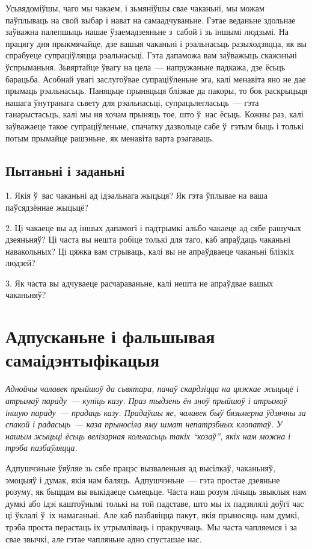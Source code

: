 Усьвядоміўшы, чаго мы чакаем, і зьмяніўшы свае чаканьні, мы можам паўплываць на свой выбар і нават на самаадчуваньне. Гэтае веданьне здольнае заўважна палепшыць нашае ўзаемадзеяньне з~сабой і зь іншымі людзьмі. На працягу дня прыкмячайце, дзе вашыя чаканьні і рэальнасьць разыходзяцца, як вы спрабуеце супраціўляцца рэальнасьці. Гэта дапаможа вам заўважыць скажэньні ўспрыманьня. Зьвяртайце ўвагу на цела~--- напружаньне падкажа, дзе ёсьць барацьба. Асобнай увагі заслугоўвае супраціўленьне эга, калі менавіта яно не дае прымаць рэальнасьць. Паняцьце прыняцьця блізкае да пакоры, то бок раскрыцьця нашага ўнутранага сьвету для рэальнасьці, супрацьлегласьць~--- гэта ганарыстасьць, калі мы ня хочам прыняць тое, што ў~нас ёсьць. Кожны раз, калі заўважаеце такое супраціўленьне, спачатку дазвольце сабе ў~гэтым быць і толькі потым прымайце рашэньне, як менавіта варта рэагаваць.

\subsection*{Пытаньні і заданьні}

1. Якія ў~вас чаканьні ад ідэальнага жыцьця? Як гэта ўплывае на ваша паўсядзённае жыцьцё?

2. Ці чакаеце вы ад іншых дапамогі і падтрымкі альбо чакаеце ад сябе рашучых дзеяньняў? Ці часта вы нешта робіце толькі для таго, каб апраўдаць чаканьні навакольных? Ці цяжка вам стрываць, калі вы не апраўдваеце чаканьні блізкіх людзей?

3. Як часта вы адчуваеце расчараваньне, калі нешта не апраўдвае вашых чаканьняў?


\section{Адпусканьне і фальшывая самаідэнтыфікацыя}

\emph{Аднойчы чалавек прыйшоў да сьвятара, пачаў скардзіцца на цяжкае жыцьцё і атрымаў параду~--- купіць казу. Праз тыдзень ён зноў прыйшоў і атрымаў іншую параду~--- прадаць казу. Прадаўшы яе, чалавек быў бязьмерна ўдзячны за спакой і радасьць~--- каза прыносіла яму шмат непатрэбных клопатаў. У нашым жыцьці ёсьць велізарная колькасьць такіх ``козаў'', якіх нам можна і трэба пазбаўляцца.}


Адпушчэньне ўяўляе зь сябе працэс вызваленьня ад высілкаў, чаканьняў, эмоцыяў і думак, якія нам баляць. Адпушчэньне~--- гэта простае дзеяньне розуму, як быццам вы выкідаеце сьмецьце. Часта наш розум лічыць звыклыя нам думкі або ідэі каштоўнымі толькі на той падставе, што мы іх падзялялі доўгі час ці ўклалі ў~іх намаганьні. Але каб пазбавіцца пакут, якія прыносяць нам думкі, трэба проста перастаць іх утрымліваць і пракручваць. Мы часта чапляемся і за свае звычкі, але гэтае чапляньне адно спусташае нас.

